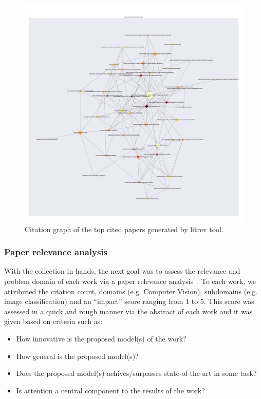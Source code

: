 \documentclass[12pt]{article}
\begin{document}
\begin{figure}
\begin{center}
    \includegraphics[width=0.7\linewidth]{./img/titles-graph.pdf}
\caption{
    Citation graph of the top cited papers generated by litrev tool.
}
\label{fig:citations}
\end{center}
\end{figure}

\subsubsection{Paper relevance analysis}
With the collection in hands, the next goal was to assess the relevance and problem domain of each work
via a paper relevance analysis~\cite{ref:paper-relevance}.
To each work, we attributed the citation count, domains (e.g. Computer Vision), subdomains (e.g. image classification)
and an ``impact'' score ranging from 1 to 5. This score was assessed in a quick and rough manner via the abstract of each
work and it was given based on criteria such as:
\begin{itemize}
    \item How innovative is the proposed model(s) of the work?
    \item How general is the proposed model(s)?
    \item Does the proposed model(s) achives/surpasses state-of-the-art in some task?
    \item Is attention a central component to the results of the work?
\end{itemize}
\end{document}
